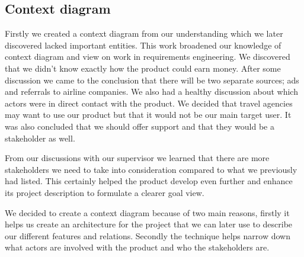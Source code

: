 

\subsection{Context diagram}

Firstly we created a context diagram from our understanding which we later discovered lacked important entities. This work broadened our knowledge of context diagram and view on work in requirements engineering. We discovered that we didn’t know exactly how the product could earn money. After some discussion we came to the conclusion that there will be two separate sources; ads and referrals to airline companies. We also had a healthy discussion about which actors were in direct contact with the product. We decided that travel agencies may want to use our product but that it would not be our main target user. It was also concluded that we should offer support and that they would be a stakeholder as well. 

From our discussions with our supervisor we learned that there are more stakeholders we need to take into consideration compared to what we previously had listed. This certainly helped the product develop even further and enhance its project description to formulate a clearer goal view. 

We decided to create a context diagram because of two main reasons, firstly it helps us create an architecture for the project that we can later use to describe our different features and relations. Secondly the technique helps narrow down what actors are involved with the product and who the stakeholders are.

